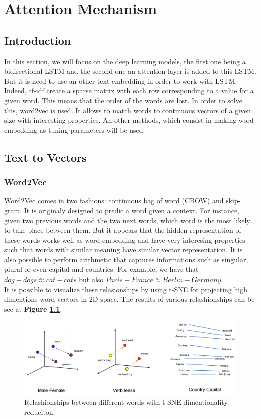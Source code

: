\chapter{Attention Mechanism}
\section{Introduction}
In this section, we will focus on the deep learning models, the first one being a bidirectional LSTM and the second one an attention layer is added to this LSTM. But it is need to use an other text embedding in order to work with LSTM. Indeed, tf-idf create a sparse matrix with each row corresponding to a value for a given word. This means that the order of the words are lost. In order to solve this, word2vec\cite{Mikolov2013} is used. It allows to match words to continuous vectors of a given size with interesting properties. An other methods, which consist in making word embedding as tuning parameters will be used.

\section{Text to Vectors}
\subsection{Word2Vec}
Word2Vec comes in two fashions: continuous bag of word (CBOW) and skip-gram. It is originaly designed to predic a word given a context. For instance, given two previous words and the two next words, which word is the most likely to take place between them. But it appears that the hidden representation of these words works well as word embedding and have very interesing properties such that words with similar meaning have similar vector representation. It is also possible to perform arithmetic that captures informations such as singular, plural or even capital and countries. For example, we have that $dog - dogs \approx cat - cats$ but also $Paris - France \approx Berlin - Germany$. \\

It is possible to visualize these relasionships by using t-SNE for projecting high dimentions word vectors in 2D space. The results of various relashionships can be see at \textbf{Figure \ref{fig:chap4:word2vec}}.
\begin{figure}
	\centering
	\includegraphics[width=\textwidth]{images/chapitre4/linear-relationships}
	\caption{Relashionships between different words with t-SNE dimentionality reduciton. }
	\label{fig:chap4:word2vec}
\end{figure}

